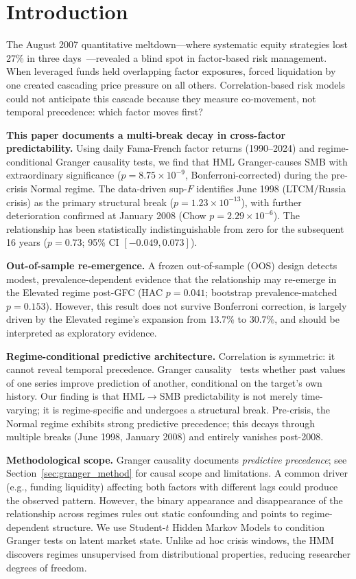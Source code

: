 \documentclass[sigconf,anonymous]{acmart}
\begin{document}
\section{Introduction}

The August 2007 quantitative meltdown---where systematic equity strategies
lost 27\% in three days~\cite{khandani2011quants}---revealed a blind spot
in factor-based risk management. When leveraged funds held overlapping factor
exposures, forced liquidation by one created cascading price pressure on all
others. Correlation-based risk models could not anticipate this cascade because
they measure co-movement, not temporal precedence: which factor moves first?

\textbf{This paper documents a multi-break decay in cross-factor predictability.}
Using daily Fama-French factor returns (1990--2024) and regime-conditional
Granger causality tests, we find that HML Granger-causes SMB with extraordinary
significance ($p = 8.75 \times 10^{-9}$, Bonferroni-corrected) during the
pre-crisis Normal regime. The data-driven sup-$F$ identifies June 1998 (LTCM/Russia crisis)
as the primary structural break ($p = 1.23 \times 10^{-13}$), with further
deterioration confirmed at January 2008 (Chow $p = 2.29 \times 10^{-6}$).
The relationship has been statistically indistinguishable from zero
for the subsequent 16 years ($p = 0.73$; 95\% CI $[-0.049, 0.073]$).

\textbf{Out-of-sample re-emergence.}
A frozen out-of-sample (OOS) design detects modest, prevalence-dependent evidence that the relationship
may re-emerge in the Elevated regime post-GFC (HAC $p = 0.041$; bootstrap prevalence-matched
$p = 0.153$). However, this result does not survive Bonferroni correction, is largely driven by
the Elevated regime's expansion from 13.7\% to 30.7\%, and should be interpreted as exploratory evidence.

\textbf{Regime-conditional predictive architecture.}
Correlation is symmetric: it cannot reveal temporal precedence. Granger
causality~\cite{granger1969investigating} tests whether past values of one
series improve prediction of another, conditional on the target's own history.
Our finding is that HML$\to$SMB predictability is not merely time-varying;
it is regime-specific and undergoes a structural break. Pre-crisis, the Normal
regime exhibits strong predictive precedence; this decays through multiple breaks
(June 1998, January 2008) and entirely vanishes post-2008.

\textbf{Methodological scope.} Granger causality documents \emph{predictive
precedence}; see Section~\ref{sec:granger_method} for causal scope and limitations.
A common driver (e.g., funding liquidity) affecting both factors with different
lags could produce the observed pattern. However, the binary appearance and
disappearance of the relationship across regimes rules out static confounding
and points to regime-dependent structure.
We use Student-$t$ Hidden Markov Models to condition Granger tests on latent
market state. Unlike ad hoc crisis windows, the HMM discovers regimes
unsupervised from distributional properties, reducing researcher degrees of
freedom.
\end{document}
